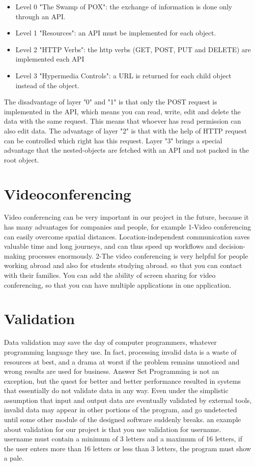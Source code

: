\begin{itemize}
    \item Level 0 "The Swamp of POX": the exchange of information is done only through an API\@.
    \item Level 1 "Resources": an API must be implemented for each object.
    \item Level 2 "HTTP Verbs": the http verbs (GET, POST, PUT and DELETE) are implemented each API
    \item Level 3 "Hypermedia Controls": a URL is returned for each child object instead of the object.
\end{itemize}
\noiondent
The disadvantage of layer "0" and "1" is that only the POST request is implemented in the API,
which means you can read, write, edit and delete the data with the same request.
This means that whoever has read permission can also edit data.
The advantage of layer "2" is that with the help of HTTP request can be controlled which right has
this request.
Layer "3" brings a special advantage that the nested-objects are fetched with an API and not packed
in the root object.

\section {Videoconferencing}\label{sec:vidioconferenz}
Video conferencing can be very important in our project in the future, because it has many advantages
for companies and people, for example
1-Video conferencing can easily overcome spatial distances. Location-independent communication
saves valuable time and long journeys, and can thus speed up workflows and decision-making processes
enormously.
2-The video conferencing is very helpful for people working abroad and also for students studying abroad.
so that you can contact with their families.
You can add the ability of screen sharing for video conferencing, so that you can have multiple applications
in one application.


\section{Validation}\label{sec:validation}
Data validation may save the day of computer programmers, whatever programming language they use.
In fact, processing invalid data is a waste of resources at best, and a drama at worst if the problem
remains unnoticed and wrong results are used for business. Answer Set Programming is not an exception,
but the quest for better and better performance resulted in systems that essentially do not validate
data in any way. Even under the simplistic assumption that input and output data are eventually
validated by external tools, invalid data may appear in other portions of the program, and go
undetected until some other module of the designed software suddenly breaks.
an example about validation for our project is
that you use validation for username.
username must contain a minimum of 3 letters and a maximum of 16 letters, if the user enters more
than 16 letters or less than 3 letters, the program must show a pale.



